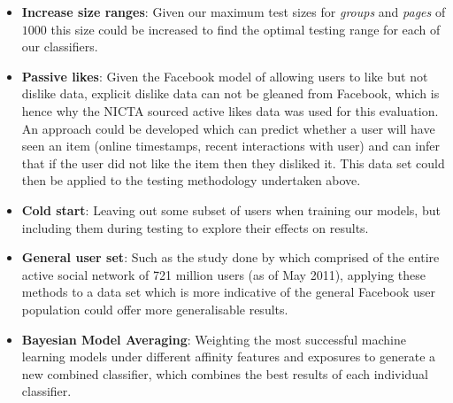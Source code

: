 \begin{itemize}
\item \textbf{Increase size ranges}: Given our maximum test sizes for \emph{groups} and \emph{pages} of $1000$ this size could be 
increased to find the optimal testing range for each of our classifiers.
\item \textbf{Passive likes}: Given the Facebook model of allowing users to like but not dislike data, explicit dislike data can not be 
gleaned from Facebook, which is hence why the NICTA sourced active likes data was used for this evaluation. An approach could be developed 
which can predict whether a user will have seen an item (online timestamps, recent interactions with user) and can infer that if the 
user did not like the item then they disliked it. This data set could then be applied to the testing methodology undertaken above.
\item \textbf{Cold start}: Leaving out some subset of users when training our models, but including them during testing to explore their 
effects on results.
\item \textbf{General user set}: Such as the study done by \cite{jugand} which comprised of the entire active social network of 721 million users 
(as of May 2011), applying these methods to a data set which is more indicative of the general Facebook user population could offer more 
generalisable results.
\item \textbf{Bayesian Model Averaging}: Weighting the most successful machine learning models under different affinity features and 
exposures to generate a new combined classifier, which combines the best results of each individual classifier.
\end{itemize}

